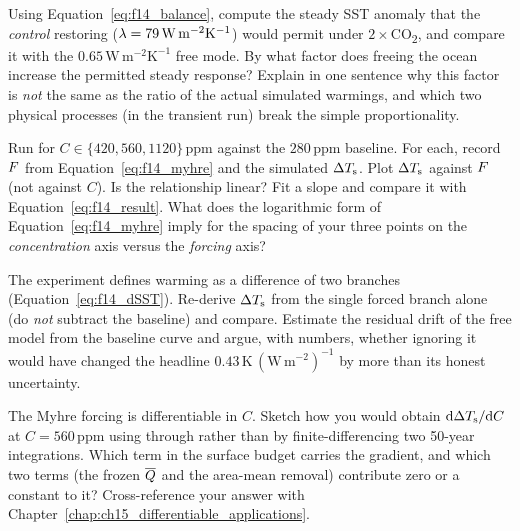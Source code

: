 \begin{exercise}
Using Equation~\eqref{eq:f14_balance}, compute the steady SST anomaly that the
\emph{control} restoring ($\lambda=79\,\mathrm{W\,m^{-2}K^{-1}}$) would permit
under $2\times$CO\textsubscript{2}, and compare it with the
$0.65\,\mathrm{W\,m^{-2}K^{-1}}$ free mode. By what factor does freeing the ocean
increase the permitted steady response? Explain in one sentence why this factor
is \emph{not} the same as the ratio of the actual simulated warmings, and which
two physical processes (in the transient run) break the simple proportionality.
\end{exercise}

\begin{exercise}
Run  for $C\in\{420,560,1120\}\,\mathrm{ppm}$
against the $280\,\mathrm{ppm}$ baseline. For each, record $F$ from
Equation~\eqref{eq:f14_myhre} and the simulated $\Delta T_{\mathrm{s}}$. Plot $\Delta T_{\mathrm{s}}$
against $F$ (not against $C$). Is the relationship linear? Fit a slope and
compare it with Equation~\eqref{eq:f14_result}. What does the logarithmic form of
Equation~\eqref{eq:f14_myhre} imply for the spacing of your three points on the
\emph{concentration} axis versus the \emph{forcing} axis?
\end{exercise}

\begin{exercise}
The experiment defines warming as a difference of two branches
(Equation~\eqref{eq:f14_dSST}). Re-derive $\Delta T_{\mathrm{s}}$ from the single forced
branch alone (do \emph{not} subtract the baseline) and compare. Estimate the
residual drift of the free model from the baseline curve and argue, with numbers,
whether ignoring it would have changed the headline
$0.43\,\mathrm{K\,(W\,m^{-2})^{-1}}$ by more than its honest uncertainty.
\end{exercise}

\begin{exercise}
The Myhre forcing is differentiable in $C$. Sketch how you would obtain
$\mathrm{d}\Delta T_{\mathrm{s}}/\mathrm{d}C$ at $C=560\,\mathrm{ppm}$ using 
through  rather than by finite-differencing two 50-year
integrations. Which term in the surface budget carries the gradient, and which
two terms (the frozen $\overline{Q}$ and the area-mean removal) contribute zero or a
constant to it? Cross-reference your answer with
Chapter~\ref{chap:ch15_differentiable_applications}.
\end{exercise}
